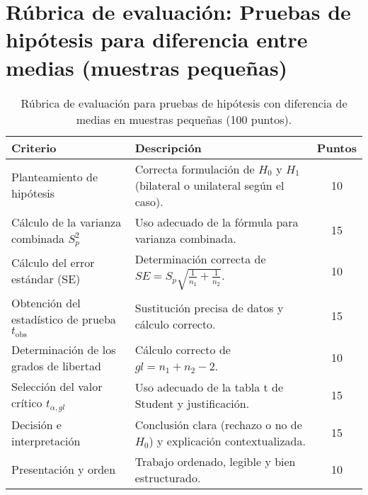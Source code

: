 
\section*{Rúbrica de evaluación: Pruebas de hipótesis para diferencia entre medias (muestras pequeñas)}

\begin{table}[H]
\centering
\begin{tabular}{p{} p{} c}
\toprule
\textbf{Criterio} & \textbf{Descripción} & \textbf{Puntos}\\
\midrule
Planteamiento de hipótesis & Correcta formulación de $H_0$ y $H_1$ (bilateral o unilateral según el caso). & 10\\
Cálculo de la varianza combinada $S_p^2$ & Uso adecuado de la fórmula para varianza combinada. & 15\\
Cálculo del error estándar (SE) & Determinación correcta de $SE = S_p \sqrt{\tfrac{1}{n_1}+\tfrac{1}{n_2}}$. & 10\\
Obtención del estadístico de prueba $t_{\text{obs}}$ & Sustitución precisa de datos y cálculo correcto. & 15\\
Determinación de los grados de libertad & Cálculo correcto de $gl = n_1 + n_2 - 2$. & 10\\
Selección del valor crítico $t_{\alpha,gl}$ & Uso adecuado de la tabla t de Student y justificación. & 15\\
Decisión e interpretación & Conclusión clara (rechazo o no de $H_0$) y explicación contextualizada. & 15\\
Presentación y orden & Trabajo ordenado, legible y bien estructurado. & 10\\
\bottomrule
\end{tabular}
\caption{Rúbrica de evaluación para pruebas de hipótesis con diferencia de medias en muestras pequeñas (100 puntos).}
\end{table}
